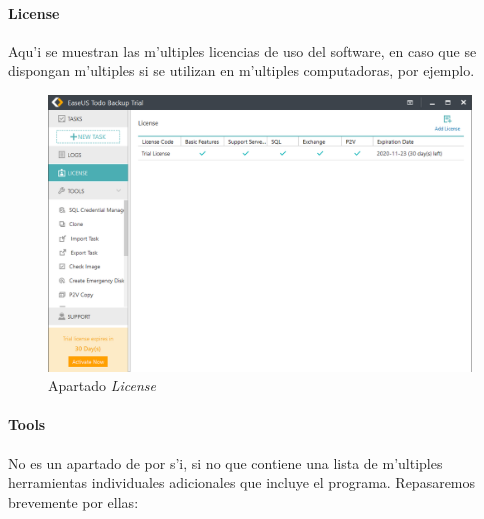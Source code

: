 \documentclass[11pt]{article}
\begin{document}
		\paragraph{License}
		
		Aqu'i se muestran las m'ultiples licencias de uso del software, en caso que se dispongan m'ultiples si se utilizan en m'ultiples computadoras, por ejemplo.
		
		\begin{figure}[H]
			\centering
			\includegraphics[width=.8\textwidth]{Images/easeus/use_license}
			\caption{Apartado \textit{License}}
		\end{figure} 
	
		\paragraph{Tools}
		
		No es un apartado de por s'i, si no que contiene una lista de m'ultiples herramientas individuales adicionales que incluye el programa. Repasaremos brevemente por ellas:
		
\end{document}
